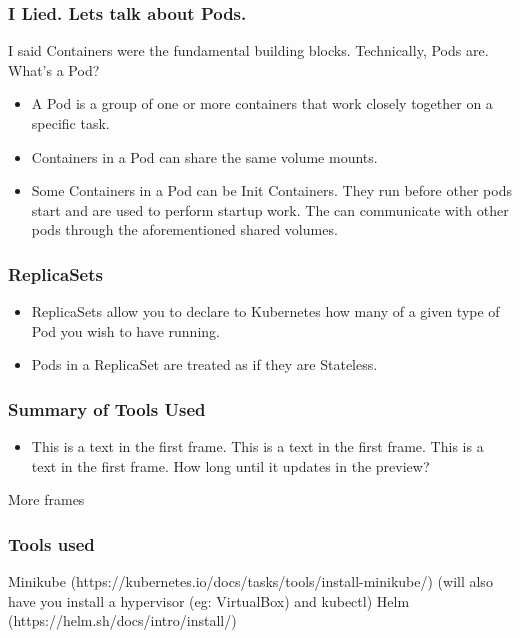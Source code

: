 \documentclass{beamer}
\begin{document}
\begin{frame}
\frametitle{I Lied. Lets talk about Pods.}
I said Containers were the fundamental building blocks. Technically, Pods are. What's a Pod?
\begin{itemize}
    \item A Pod is a group of one or more containers that work closely together on a specific task.
    \item Containers in a Pod can share the same volume mounts.
    \item Some Containers in a Pod can be Init Containers. They run before other pods start and are used to perform startup work. The can communicate with other pods through the aforementioned shared volumes.
\end{itemize}
\end{frame}

\begin{frame}
\frametitle{ReplicaSets}
\begin{itemize}    
    \item ReplicaSets allow you to declare to Kubernetes how many of a given type of Pod you wish to have running.
    \item Pods in a ReplicaSet are treated as if they are Stateless.
\end{itemize}
\end{frame}


\begin{frame}
\frametitle{Summary of Tools Used}
\begin{itemize}
    \item This is a text in the first frame. This is a text in the first frame. This is a text in the first frame. How long until it updates in the preview?
\end{itemize}
\end{frame}

\begin{frame}
More frames
\end{frame}

\begin{frame}
\frametitle{Tools used}
Minikube (https://kubernetes.io/docs/tasks/tools/install-minikube/)
(will also have you install a hypervisor (eg: VirtualBox) and kubectl)
Helm (https://helm.sh/docs/intro/install/)
\end{frame}
\end{document}
